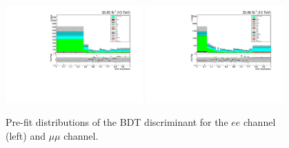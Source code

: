 \begin{figure}[htb]
\centering
\includegraphics[width=0.47\textwidth]{figs/results/prefit_ee.pdf}
\includegraphics[width=0.47\textwidth]{figs/results/prefit_mumu.pdf}
\caption{
Pre-fit distributions of the BDT discriminant for the $ee$ channel (left) and $\mu\mu$ channel.}
\label{fig:prefitBDT}
\end{figure}
